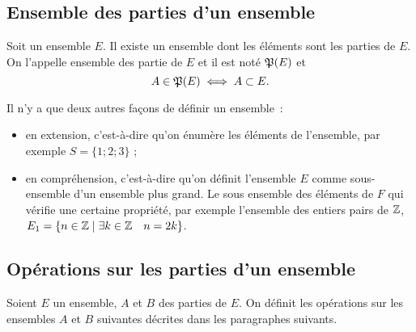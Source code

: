 \subsection{Ensemble des parties d'un ensemble}
\label{chap3-subsec:ensembledesparties}
\begin{axiome}
  Soit un ensemble $E$. Il existe un ensemble dont les éléments sont les parties de $E$. On l'appelle ensemble des partie de $E$ et il est noté $\mathfrak{P}(E)$ et
\begin{equation}
  A \in \mathfrak{P}(E) \iff A \subset E.
\end{equation}
\end{axiome}
Il n'y a que deux autres façons de définir un ensemble~:
\begin{itemize}
\item en extension, c'est-à-dire qu'on énumère les éléments de l'ensemble, par exemple $S=\{1;2;3\}$ ;
\item en compréhension, c'est-à-dire qu'on définit l'ensemble $E$ comme sous-ensemble d'un ensemble plus grand. Le sous ensemble des éléments de $F$ qui vérifie une certaine propriété, par exemple l'ensemble des entiers pairs de $\mathbb{Z}$, $E_1=\left\{n\in\mathbb{Z}\mathrel{}\middle|\mathrel{}\exists k \in \mathbb{Z} \quad n=2k\right\}$.
\end{itemize}
%
\subsection{Opérations sur les parties d'un ensemble}
\label{chap3-subsec:operationparties}
Soient $E$ un ensemble, $A$ et $B$ des parties de $E$. On définit les opérations sur les ensembles $A$ et $B$ suivantes
décrites dans les paragraphes suivants.
%
